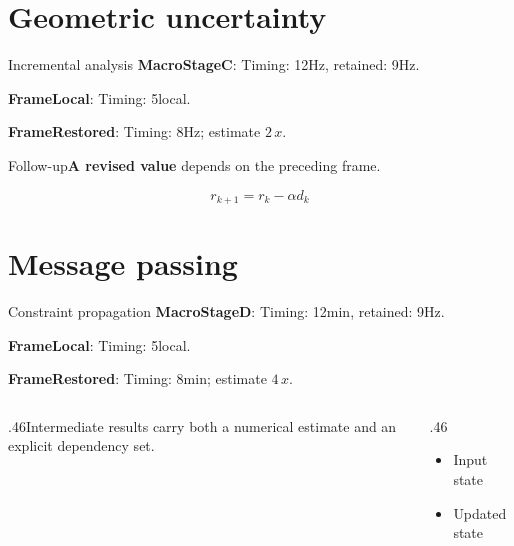 \documentclass[12pt,aspectratio=43]{beamer}
\newcommand{\fuzzlayerA}[1]{\textbf{#1}}
\newcommand{\fuzzlayerB}[1]{\fuzzlayerA{#1}}
\newcommand{\fuzzlayerC}[1]{\fuzzlayerB{#1}}
\newcommand{\fuzzterm}[1]{\fuzzlayerC{#1}}
\newcommand{\fuzzpair}[2]{\fuzzterm{#1}: #2}
\newcommand{\fuzzunit}{Hz}
\let\fuzzoriginalunit\fuzzunit
\newcommand{\fuzzcoefficient}{2}
\newcommand{\fuzzscale}[2][\fuzzcoefficient]{#1\,#2}
\begin{document}
\section{Geometric uncertainty}
\begin{frame}[t]{Incremental analysis}
\fuzzpair{MacroStageC}{Timing: 12\fuzzunit, retained: 9\fuzzoriginalunit.}\par
{\renewcommand{\fuzzunit}{local}\fuzzpair{FrameLocal}{Timing: 5\fuzzunit.}\par}
\fuzzpair{FrameRestored}{Timing: 8\fuzzunit; estimate $\fuzzscale{x}$.}\par
\begin{block}{Follow-up}\fuzzterm{A revised value} depends on the preceding frame.\end{block}
\[r_{k+1}=r_k-\alpha d_k\]
\end{frame}
\renewcommand{\fuzzunit}{min}
\renewcommand{\fuzzcoefficient}{4}
\renewcommand{\fuzzterm}[1]{{\textbf{#1}}}
\section{Message passing}
\begin{frame}[t]{Constraint propagation}
\fuzzpair{MacroStageD}{Timing: 12\fuzzunit, retained: 9\fuzzoriginalunit.}\par
{\renewcommand{\fuzzunit}{local}\fuzzpair{FrameLocal}{Timing: 5\fuzzunit.}\par}
\fuzzpair{FrameRestored}{Timing: 8\fuzzunit; estimate $\fuzzscale{x}$.}\par
\begin{columns}[T]\begin{column}{.46\textwidth}Intermediate results carry both a numerical estimate and an explicit dependency set.\end{column}\begin{column}{.46\textwidth}\begin{itemize}\item Input state\item Updated state\end{itemize}\end{column}\end{columns}
\end{frame}
\end{document}
